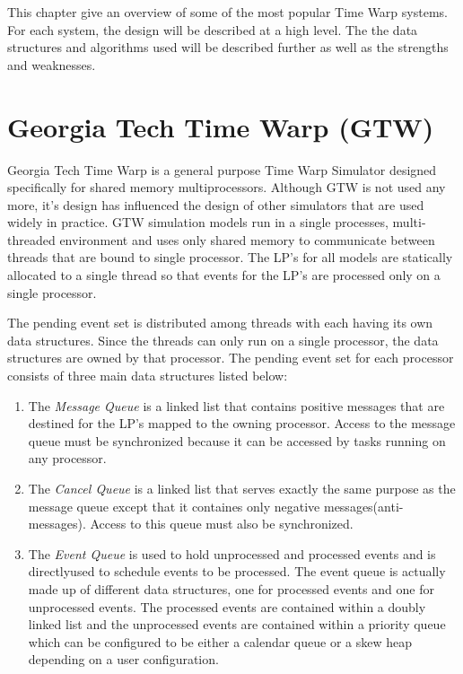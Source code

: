 \documentclass[11pt]{book}
\begin{document}
This chapter give an overview of some of the most popular Time Warp systems. For each system,
the design will be described at a high level. The the data structures and algorithms used
will be described further as well as the strengths and weaknesses.

\section{Georgia Tech Time Warp (GTW)}

Georgia Tech Time Warp is a general purpose Time Warp Simulator designed specifically for
shared memory multiprocessors. Although GTW is not used any more, it's design has influenced
the design of other simulators that are used widely in practice. GTW simulation models run
in a single processes, multi-threaded environment and uses only shared memory to communicate
between threads that are bound to single processor. The LP's for all models are statically
allocated to a single thread so that events for the LP's are processed only on a single
processor.

The pending event set is distributed among threads with each having its own data structures.
Since the threads can only run on a single processor, the data structures are owned by that
processor. The pending event set for each processor consists of three main data structures
listed below\cite{das-94}:

\begin{enumerate}
    \item The \emph{Message Queue} is a linked list that contains positive messages that
        are destined for the LP's mapped to the owning processor. Access to the message
        queue must be synchronized because it can be accessed by tasks running on any processor.
    \item The \emph{Cancel Queue} is a linked list that serves exactly the same purpose as
        the message queue except that it containes only negative messages(anti-messages).
        Access to this queue must also be synchronized.
    \item The \emph{Event Queue} is used to hold unprocessed and processed events and is
        directlyused to schedule events to be processed. The event queue is actually made
        up of different data structures, one for processed events and one for unprocessed
        events. The processed events are contained within a doubly linked list and the
        unprocessed events are contained within a priority queue which can be configured to
        be either a calendar queue or a skew heap depending on a user configuration.
\end{enumerate}
\end{document}
